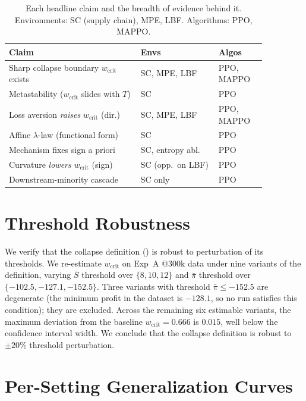 \documentclass[letterpaper]{article}
\theoremstyle{plain}
\newcommand{\wcrit}{w_{\mathrm{crit}}}
\begin{document}
\begin{table}[h]
\centering
\caption{Each headline claim and the breadth of evidence behind it.
Environments: SC (supply chain), MPE, LBF. Algorithms: PPO, MAPPO.}
\label{tab:claim_ledger}
\small
\begin{tabular}{p{0.44\linewidth}p{0.26\linewidth}p{0.16\linewidth}}
\toprule
Claim & Envs & Algos \\
\midrule
Sharp collapse boundary $\wcrit$ exists & SC, MPE, LBF & PPO, MAPPO \\
Metastability ($\wcrit$ slides with $T$) & SC & PPO \\
Loss aversion \emph{raises} $\wcrit$ (dir.) & SC, MPE, LBF & PPO, MAPPO \\
Affine $\lambda$-law (functional form) & SC & PPO \\
Mechanism fixes sign a priori & SC, entropy abl. & PPO \\
Curvature \emph{lowers} $\wcrit$ (sign) & SC (opp.\ on LBF) & PPO \\
Downstream-minority cascade & SC only & PPO \\
\bottomrule
\end{tabular}
\end{table}

\section{Threshold Robustness}
\label{sec:appendix_robustness}

We verify that the collapse definition () is robust to
perturbation of its thresholds.
We re-estimate $\wcrit$ on Exp~A @300k data under nine variants of the
definition, varying $\bar{S}$ threshold over $\{8, 10, 12\}$ and
$\bar{\pi}$ threshold over $\{-102.5, -127.1, -152.5\}$.
Three variants with threshold $\bar{\pi} \leq -152.5$ are degenerate
(the minimum profit in the dataset is $-128.1$, so no run satisfies
this condition); they are excluded.
Across the remaining six estimable variants, the maximum deviation from
the baseline $\wcrit = 0.666$ is $0.015$, well below the confidence
interval width.
We conclude that the collapse definition is robust to $\pm 20\%$ threshold
perturbation.

\section{Per-Setting Generalization Curves}
\end{document}
